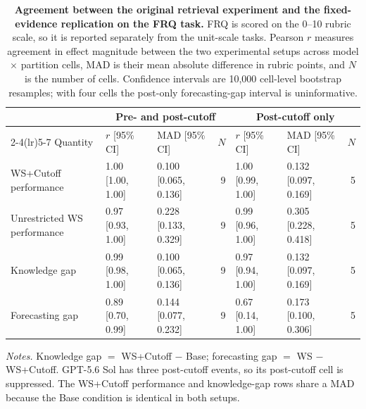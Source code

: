 \begin{table}[t]
\centering
\small
\caption{\textbf{Agreement between the original retrieval experiment and the fixed-evidence replication on the FRQ task.} FRQ is scored on the 0--10 rubric scale, so it is reported separately from the unit-scale tasks. Pearson $r$ measures agreement in effect magnitude between the two experimental setups across model $\times$ partition cells, MAD is their mean absolute difference in rubric points, and $N$ is the number of cells. Confidence intervals are 10,000 cell-level bootstrap resamples; with four cells the post-only forecasting-gap interval is uninformative.}
\label{tab:agreement_frq}
\begin{tabular}{l l l r l l r}
\toprule
& \multicolumn{3}{c}{Pre- and post-cutoff} & \multicolumn{3}{c}{Post-cutoff only} \\
\cmidrule(lr){2-4}\cmidrule(lr){5-7}
Quantity & $r$ [95\% CI] & MAD [95\% CI] & $N$ & $r$ [95\% CI] & MAD [95\% CI] & $N$ \\
\midrule
WS+Cutoff performance & 1.00 [1.00, 1.00] & 0.100 [0.065, 0.136] & 9 & 1.00 [0.99, 1.00] & 0.132 [0.097, 0.169] & 5 \\
Unrestricted WS performance & 0.97 [0.93, 1.00] & 0.228 [0.133, 0.329] & 9 & 0.99 [0.96, 1.00] & 0.305 [0.228, 0.418] & 5 \\
Knowledge gap & 0.99 [0.98, 1.00] & 0.100 [0.065, 0.136] & 9 & 0.97 [0.94, 1.00] & 0.132 [0.097, 0.169] & 5 \\
Forecasting gap & 0.89 [0.70, 0.99] & 0.144 [0.077, 0.232] & 9 & 0.67 [0.14, 1.00] & 0.173 [0.100, 0.306] & 5 \\
\bottomrule
\end{tabular}
\begin{flushleft}\footnotesize\textit{Notes.} Knowledge gap $=$ WS+Cutoff $-$ Base; forecasting gap $=$ WS $-$ WS+Cutoff. GPT-5.6 Sol has three post-cutoff events, so its post-cutoff cell is suppressed. The WS+Cutoff performance and knowledge-gap rows share a MAD because the Base condition is identical in both setups.\end{flushleft}
\end{table}
